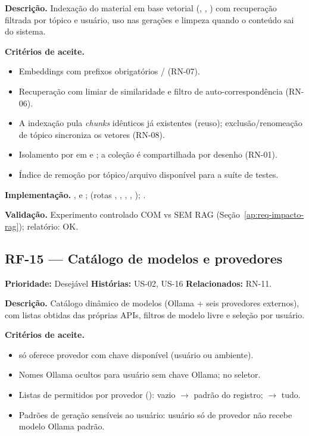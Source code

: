 \textbf{Descrição.} Indexação do material em base vetorial (\texttt{}, \texttt{}, \texttt{}) com recuperação filtrada por tópico e usuário, uso nas gerações e limpeza quando o conteúdo sai do sistema.

\textbf{Critérios de aceite.}
\begin{itemize}
    \item Embeddings com prefixos obrigatórios \texttt{}/\texttt{} (RN-07).
    \item Recuperação com limiar de similaridade e filtro de auto-correspondência (RN-06).
    \item A indexação pula \emph{chunks} idênticos já existentes (reuso); exclusão/renomeação de tópico sincroniza os vetores (RN-08).
    \item Isolamento por \texttt{} em \texttt{} e \texttt{}; a coleção \texttt{} é compartilhada por desenho (RN-01).
    \item Índice de remoção por tópico/arquivo disponível para a suíte de testes.
\end{itemize}

\textbf{Implementação.} ,  e ;  (rotas \texttt{}, \texttt{}, \texttt{}, \texttt{}, \texttt{}); .

\textbf{Validação.} Experimento controlado COM vs SEM RAG (Seção~\ref{ap:req-impacto-rag}); relatório: \texttt{} OK.

\subsection{RF-15 --- Catálogo de modelos e provedores}

\textbf{Prioridade:} Desejável \quad \textbf{Histórias:} US-02, US-16 \quad \textbf{Relacionados:} RN-11.

\textbf{Descrição.} Catálogo dinâmico de modelos (Ollama + seis provedores externos), com listas obtidas das próprias APIs, filtros de modelo livre e seleção por usuário.

\textbf{Critérios de aceite.}
\begin{itemize}
    \item \texttt{} só oferece provedor com chave disponível (usuário ou ambiente).
    \item Nomes Ollama ocultos para usuário sem chave Ollama; \texttt{} no seletor.
    \item Listas de permitidos por provedor (\texttt{}): vazio $\rightarrow$ padrão do registro; \texttt{\seqcod{*}} $\rightarrow$ tudo.
    \item Padrões de geração sensíveis ao usuário: usuário só de provedor não recebe modelo Ollama padrão.
\end{itemize}

